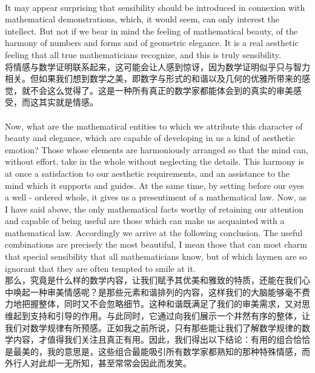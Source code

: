 \documentclass{article}
\begin{document}
\\
It may appear surprising that sensibility should be introduced in connexion with mathematical demonstrations, which, it would seem, can only interest the intellect. But not if we bear in mind the feeling of mathematical beauty, of the harmony of numbers and forms and of geometric elegance. It is a real aesthetic feeling that all true mathematicians recognize, and this is truly sensibility.\\
将情感与数学证明联系起来，这可能会让人感到惊讶，因为数学证明似乎只与智力相关。但如果我们想到数学之美，即数字与形式的和谐以及几何的优雅所带来的感觉，就不会这么觉得了。这是一种所有真正的数学家都能体会到的真实的审美感受，而这其实就是情感。 \\ 

\\
Now, what are the mathematical entities to which we attribute this character of beauty and elegance, which are capable of developing in us a kind of aesthetic emotion? Those whose elements are harmoniously arranged so that the mind can, without effort, take in the whole without neglecting the details. This harmony is at once a satisfaction to our aesthetic requirements, and an assistance to the mind which it supports and guides. At the same time, by setting before our eyes a well - ordered whole, it gives us a presentiment of a mathematical law. Now, as I have said above, the only mathematical facts worthy of retaining our attention and capable of being useful are those which can make us acquainted with a mathematical law. Accordingly we arrive at the following conclusion. The useful combinations are precisely the most beautiful, I mean those that can most charm that special sensibility that all mathematicians know, but of which laymen are so ignorant that they are often tempted to smile at it.\\
那么，究竟是什么样的数学内容，让我们赋予其优美和雅致的特质，还能在我们心中唤起一种审美情感呢？是那些元素和谐排列的内容，这样我们的大脑能够毫不费力地把握整体，同时又不会忽略细节。这种和谐既满足了我们的审美需求，又对思维起到支持和引导的作用。与此同时，它通过向我们展示一个井然有序的整体，让我们对数学规律有所预感。正如我之前所说，只有那些能让我们了解数学规律的数学内容，才值得我们关注且真正有用。因此，我们得出以下结论：有用的组合恰恰是最美的，我的意思是，这些组合最能吸引所有数学家都熟知的那种特殊情感，而外行人对此却一无所知，甚至常常会因此而发笑。 \\ 
\end{document}
